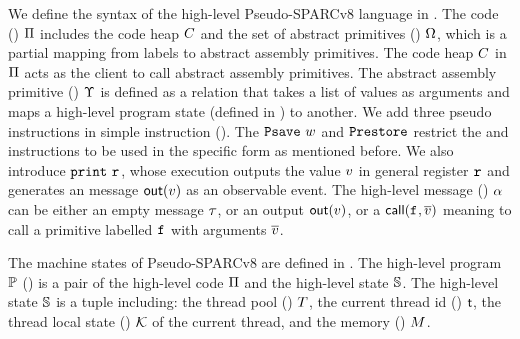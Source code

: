 We define the syntax of the high-level Pseudo-SPARCv8 language
in \Fig{\ref{fig:syntax-of-concur-pseudo-sparc}}.
The code () $\Pi$ includes
the code heap $C$
and the set of abstract primitives () $\Omega$,
which is a partial mapping from labels to
abstract assembly primitives. The code heap $C$ in $\Pi$
acts as the client to
call abstract assembly primitives.
The abstract assembly primitive () $\Upsilon$
is defined as a relation that takes a list of values
as arguments and maps a high-level program state
(defined in \Fig{\ref{fig:machine-state-concur-pseudo-sparc}})
to another.
We add three pseudo instructions in simple instruction ().
The $\texttt{Psave} \ w$
and $\texttt{Prestore}$ restrict the \csave{} and \crestore{} 
instructions to be used in the specific form as
mentioned before.
We also introduce $\texttt{print} \ \texttt{r}_{}$,
whose execution outputs the value $v$ in
general register $\texttt{r}_{}$ and
generates an message $\textsf{out}({v})$
as an observable event.
The high-level message ()
$\alpha$ can be either an empty message $\tau$, or an output
$\textsf{out}({v})$, or a $\textsf{call}({\texttt{f}_{}, \overline{v}})$ meaning to
call a primitive labelled $\texttt{f}_{}$ with arguments $\overline{v}$.

The machine states 
of Pseudo-SPARCv8 are defined 
in \Fig{\ref{fig:machine-state-concur-pseudo-sparc}}.
The high-level program $\mathbb{P}$ () 
is a pair of the high-level code
$\Pi$ and the high-level state $\mathbb{S}$. 
The high-level state $\mathbb{S}$ is a tuple including: 
the thread pool () $T$,
the current thread id () $\textsf{t}$, 
the thread local state () $\mathcal{K}$ 
of the current thread, and the memory () $M$.

